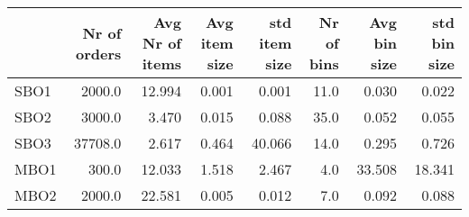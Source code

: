 \begin{tabular}{lrrrrrrr}
\toprule
{} &  Nr of orders &  Avg Nr of items &  Avg item size &  std item size &  Nr of bins &  Avg bin size &  std bin size \\
\midrule
SBO1 &        2000.0 &           12.994 &          0.001 &          0.001 &        11.0 &         0.030 &         0.022 \\
SBO2 &        3000.0 &            3.470 &          0.015 &          0.088 &        35.0 &         0.052 &         0.055 \\
SBO3 &       37708.0 &            2.617 &          0.464 &         40.066 &        14.0 &         0.295 &         0.726 \\
MBO1 &         300.0 &           12.033 &          1.518 &          2.467 &         4.0 &        33.508 &        18.341 \\
MBO2 &        2000.0 &           22.581 &          0.005 &          0.012 &         7.0 &         0.092 &         0.088 \\
\bottomrule
\end{tabular}
